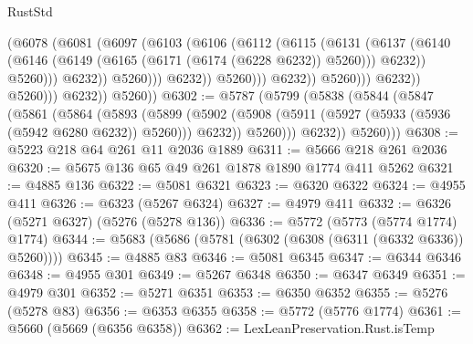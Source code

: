 \begin{lexlean}{RustStd}
\begin{coremodule}
                                        (@6078
                                          (@6081
                                            (@6097
                                              (@6103
                                                (@6106
                                                  (@6112
                                                    (@6115
                                                      (@6131
                                                        (@6137
                                                          (@6140
                                                            (@6146
                                                              (@6149
                                                                (@6165
                                                                  (@6171
                                                                    (@6174 (@6228 @6232))
                                                                    @5260)))
                                                              @6232))
                                                          @5260)))
                                                    @6232))
                                                @5260)))
                                          @6232))
                                      @5260)))
                                @6232))
                            @5260)))
                      @6232))
                  @5260)))
            @6232))
        @5260))
@6302 := @5787
    (@5799
      (@5838
        (@5844
          (@5847
            (@5861
              (@5864
                (@5893
                  (@5899
                    (@5902 (@5908 (@5911 (@5927 (@5933 (@5936 (@5942 @6280 @6232)) @5260))) @6232))
                    @5260)))
              @6232))
          @5260)))
@6308 := @5223 @218 @64 @261 @11 @2036 @1889
@6311 := @5666 @218 @261 @2036
@6320 := @5675 @136 @65 @49 @261 @1878 @1890 @1774 @411 @5262
@6321 := @4885 @136
@6322 := @5081 @6321
@6323 := @6320 @6322
@6324 := @4955 @411
@6326 := @6323 (@5267 @6324)
@6327 := @4979 @411
@6332 := @6326 (@5271 @6327) (@5276 (@5278 @136))
@6336 := @5772 (@5773 (@5774 @1774) @1774)
@6344 := @5683 (@5686 (@5781 (@6302 (@6308 (@6311 (@6332 @6336)) @5260))))
@6345 := @4885 @83
@6346 := @5081 @6345
@6347 := @6344 @6346
@6348 := @4955 @301
@6349 := @5267 @6348
@6350 := @6347 @6349
@6351 := @4979 @301
@6352 := @5271 @6351
@6353 := @6350 @6352
@6355 := @5276 (@5278 @83)
@6356 := @6353 @6355
@6358 := @5772 (@5776 @1774)
@6361 := @5660 (@5669 (@6356 @6358))
@6362 := LexLeanPreservation.Rust.isTemp

\end{coremodule}
\end{lexlean}
